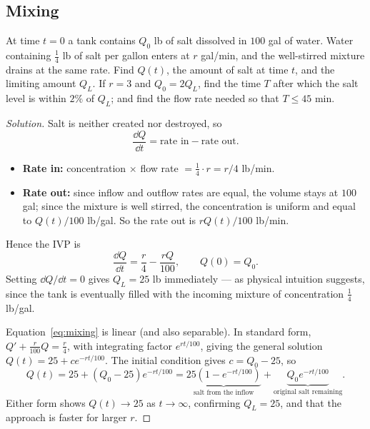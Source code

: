 \subsection{Mixing}

\begin{eg}
	At time \(t = 0\) a tank contains \(Q_0\) lb of salt dissolved in \(100\) gal of
	water. Water containing \(\frac14\) lb of salt per gallon enters at \(r\) gal/min, and
	the well-stirred mixture drains at the same rate. Find \(Q(t)\), the amount of salt at
	time \(t\), and the limiting amount \(Q_L\). If \(r = 3\) and \(Q_0 = 2Q_L\), find the
	time \(T\) after which the salt level is within \(2\%\) of \(Q_L\); and find the flow
	rate needed so that \(T \leq 45\) min.
\end{eg}

\begin{proof}[Solution]
	Salt is neither created nor destroyed, so
	\begin{equation}\label{eq:balance}
		\frac{\dd Q}{\dd t} = \text{rate in} - \text{rate out}.
	\end{equation}
	\begin{itemize}
		\item \textbf{Rate in:} concentration \(\times\) flow rate
		      \(= \frac14 \cdot r = r/4\) lb/min.
		\item \textbf{Rate out:} since inflow and outflow rates are equal, the volume stays
		      at \(100\) gal; since the mixture is well stirred, the concentration is uniform
		      and equal to \(Q(t)/100\) lb/gal. So the rate out is \(rQ(t)/100\) lb/min.
	\end{itemize}
	Hence the IVP is
	\begin{equation}\label{eq:mixing}
		\frac{\dd Q}{\dd t} = \frac{r}{4} - \frac{rQ}{100}, \qquad Q(0) = Q_0.
	\end{equation}
	Setting \(\dd Q/\dd t = 0\) gives \(Q_L = 25\) lb immediately --- as physical
	intuition suggests, since the tank is eventually filled with the incoming mixture of
	concentration \(\frac14\) lb/gal.

	Equation~\eqref{eq:mixing} is linear (and also separable). In standard form,
	\(Q' + \frac{r}{100}Q = \frac{r}{4}\), with integrating factor \(e^{rt/100}\), giving
	the general solution \(Q(t) = 25 + ce^{-rt/100}\). The initial condition gives
	\(c = Q_0 - 25\), so
	\begin{equation}\label{eq:mixing-sol}
		Q(t) = 25 + (Q_0 - 25) e^{-rt/100}
		= \underbrace{25\left( 1 - e^{-rt/100} \right)}_{\text{salt from the inflow}}
		+ \underbrace{Q_0 e^{-rt/100}}_{\text{original salt remaining}}.
	\end{equation}
	Either form shows \(Q(t) \to 25\) as \(t \to \infty\), confirming \(Q_L = 25\), and
	that the approach is faster for larger \(r\).


\end{proof}
